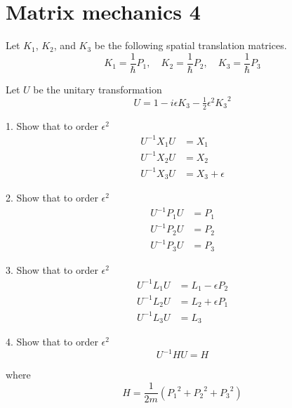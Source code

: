 

\section*{Matrix mechanics 4}

Let $K_1$, $K_2$, and $K_3$ be the following spatial translation matrices.
\begin{equation*}
K_1=\frac{1}{\hbar}P_1,\quad K_2=\frac{1}{\hbar}P_2,\quad K_3=\frac{1}{\hbar}P_3
\end{equation*}

Let $U$ be the unitary transformation
\begin{equation*}
U=1-i\epsilon K_3-\tfrac{1}{2}\epsilon^2{K_3}^2
\end{equation*}

1. Show that to order $\epsilon^2$
\begin{align*}
U^{-1}X_1U&=X_1
\\
U^{-1}X_2U&=X_2
\\
U^{-1}X_3U&=X_3+\epsilon
\end{align*}

2. Show that to order $\epsilon^2$
\begin{align*}
U^{-1}P_1U&=P_1
\\
U^{-1}P_2U&=P_2
\\
U^{-1}P_3U&=P_3
\end{align*}

3. Show that to order $\epsilon^2$
\begin{align*}
U^{-1}L_1U&=L_1-\epsilon P_2
\\
U^{-1}L_2U&=L_2+\epsilon P_1
\\
U^{-1}L_3U&=L_3
\end{align*}

4. Show that to order $\epsilon^2$
\begin{equation*}
U^{-1}HU=H
\end{equation*}

where
\begin{equation*}
H=\frac{1}{2m}\left({P_1}^2+{P_2}^2+{P_3}^2\right)
\end{equation*}


